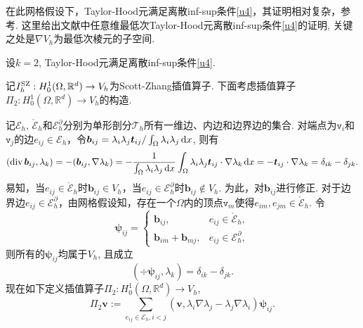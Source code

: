 在此网格假设下，Taylor-Hood元满足离散inf-sup条件\eqref{u4}，其证明相对复杂，参考\cite{BoffiBrezziFortin2013,Boffi1994,Boffi1997,GiraultScott2003,Chen2014,DieningStornTscherpel2022}. 这里给出文献\cite{DieningStornTscherpel2022}中任意维最低次Taylor-Hood元离散inf-sup条件\eqref{u4}的证明, 关键之处是$\nabla V_{h}$为最低次棱元的子空间.
\begin{lemma}
设$k=2$, Taylor-Hood元满足离散inf-sup条件\eqref{u4}.
\end{lemma}
\begin{prf}
记$I_h^{\rm SZ}: H_{0}^{1}(\Omega,\mathbb{R}^{d})\to V_{h}$为Scott-Zhang插值算子\cite{ScottZhang1990}.
下面考虑插值算子$\Pi_2: H_{0}^{1}(\Omega,\mathbb{R}^{d})\to V_{h}$的构造.

记$\mathcal E_h$, $\mathring{\mathcal E}_h$和$\mathcal E^{\partial}_h$分别为单形剖分$\mathcal T_h$所有一维边、内边和边界边的集合. 对端点为$\texttt{v}_i$和$\texttt{v}_j$的边$e_{ij}\in\mathcal E_h$，令$\boldsymbol{b}_{ij}=\lambda_i\lambda_j\boldsymbol{t}_{ij}/\int_{\Omega}\lambda_i\lambda_j\,{\rm d}x$, 则有
\begin{equation*}
(\operatorname{div}\boldsymbol{b}_{ij}, \lambda_k)=-(\boldsymbol{b}_{ij}, \nabla \lambda_{k})=-\frac{1}{\int_{\Omega}\lambda_{i}\lambda_{j}\,{\rm d}x}\int_{\Omega}\lambda_{i}\lambda_{j}\boldsymbol{t}_{ij}\cdot\nabla\lambda_{k}\,{\rm d}x=-\boldsymbol{t}_{ij}\cdot\nabla\lambda_{k}=\delta_{ik}-\delta_{jk}.
\end{equation*}
易知，当$e_{ij}\in\mathring{\mathcal E}_h$时$\boldsymbol{b}_{ij}\in V_{h}$，当$e_{ij}\in\mathcal E^{\partial}_h$时$\boldsymbol{b}_{ij}\not\in V_{h}$. 为此，对$\boldsymbol{b}_{ij}$进行修正.
对于边界边$e_{ij}\in\mathcal E^{\partial}_h$，由网格假设知，存在一个$\Omega$内的顶点$\texttt{v}_m$使得$e_{im}, e_{jm}\in\mathring{\mathcal E}_h$. 令
\begin{equation*}
\boldsymbol{\psi}_{ij}=\begin{cases}
\boldsymbol{b}_{ij}, & e_{ij}\in\mathring{\mathcal E}_h,\\
\boldsymbol{b}_{im}+\boldsymbol{b}_{mj}, & e_{ij}\in\mathcal E^{\partial}_h,
\end{cases}
\end{equation*}
则所有的$\boldsymbol{\psi}_{ij}$均属于$V_h$, 且成立
\begin{equation*}
(\div\boldsymbol{\psi}_{ij}, \lambda_k)=\delta_{ik}-\delta_{jk}.
\end{equation*}
现在如下定义插值算子$\Pi_2: H_{0}^{1}(\Omega,\mathbb{R}^{d})\to V_{h}$, 
\begin{equation*}
\Pi_2\boldsymbol{v}:=\sum_{e_{ij}\in\mathcal E_h, i<j}(\boldsymbol{v}, \lambda_i\nabla\lambda_j-\lambda_j\nabla\lambda_i)\boldsymbol{\psi}_{ij}.

\end{equation*}
\end{prf}
